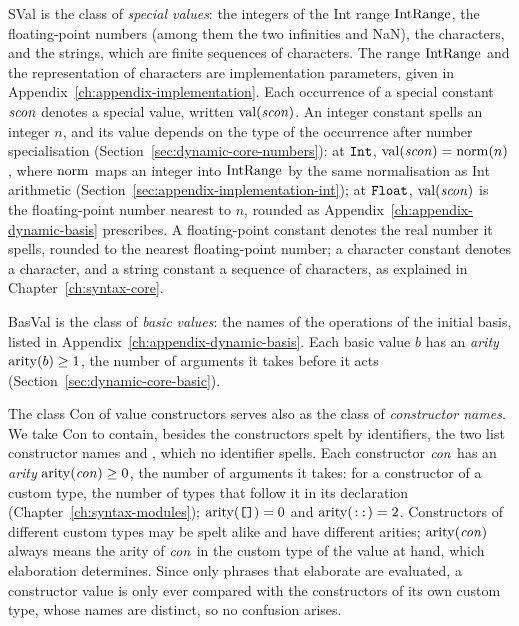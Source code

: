 SVal is the class of \emph{special values}: the integers of the Int range
$\mathrm{IntRange}$, the floating-point numbers (among them the two infinities and
NaN), the characters, and the strings, which are finite sequences of
characters. The range $\mathrm{IntRange}$ and the representation of characters are
implementation parameters, given in Appendix~\ref{ch:appendix-implementation}.
Each occurrence of a special constant $\mathit{scon}$ denotes a special value,
written $\mathrm{val}(\mathit{scon})$. An integer constant spells an integer $n$, and its
value depends on the type of the occurrence after number specialisation
(Section~\ref{sec:dynamic-core-numbers}): at $\mathtt{Int}$,
$\mathrm{val}(\mathit{scon})=\mathrm{norm}(n)$, where $\mathrm{norm}$ maps an integer into $\mathrm{IntRange}$ by
the same normalisation as Int arithmetic
(Section~\ref{sec:appendix-implementation-int}); %
at $\mathtt{Float}$, $\mathrm{val}(\mathit{scon})$ is the floating-point number nearest to $n$,
rounded as Appendix~\ref{ch:appendix-dynamic-basis} prescribes. %
A floating-point constant denotes the real number it spells, rounded to the
nearest floating-point number; a character constant denotes a character, and
a string constant a sequence of characters, as explained in
Chapter~\ref{ch:syntax-core}.

BasVal is the class of \emph{basic values}: the names of the operations of
the initial basis, listed in Appendix~\ref{ch:appendix-dynamic-basis}. Each
basic value $b$ has an \emph{arity} $\mathrm{arity}(b)\geq 1$, the number of
arguments it takes before it acts (Section~\ref{sec:dynamic-core-basic}).

The class Con of value constructors serves also as the class of
\emph{constructor names}. We take Con to contain, besides the constructors
spelt by identifiers, the two list constructor names \kw{[]} and \kw{::},
which no identifier spells.
Each constructor $\mathit{con}$ has an \emph{arity} $\mathrm{arity}(\mathit{con})\geq 0$, the number
of arguments it takes: for a constructor of a custom type, the number of
types that follow it in its declaration (Chapter~\ref{ch:syntax-modules});
$\mathrm{arity}(\textnormal{\texttt{[]}})=0$ and $\mathrm{arity}(\textnormal{\texttt{::}})=2$. Constructors of different custom
types may be spelt alike and have different arities; $\mathrm{arity}(\mathit{con})$ always
means the arity of $\mathit{con}$ in the custom type of the value at hand, which
elaboration determines. Since only phrases that elaborate are evaluated, a
constructor value is only ever compared with the constructors of its own
custom type, whose names are distinct, so no confusion arises.

